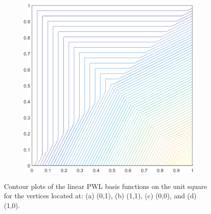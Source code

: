 \begin{figure}
\begin{subfigure}[b]{0.39\textwidth}
		\caption{}
	\end{subfigure}
	\hspace{1.5cm}
	\begin{subfigure}[b]{0.39\textwidth}
		\centering
		\includegraphics[width=\textwidth]{figures/sec_BF/square_PWLD1_contour_b2.png}
		\caption{}
	\end{subfigure}
\caption{Contour plots of the linear PWL basis functions on the unit square for the vertices located at: (a) (0,1), (b) (1,1), (c) (0,0), and (d) (1,0).}
\end{figure}

